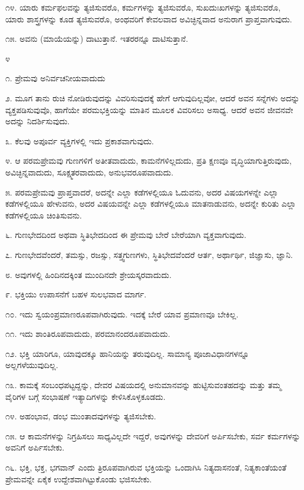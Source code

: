 ೧೪. ಯಾರು ಕರ್ಮಫಲವನ್ನು ತ್ಯಜಿಸುವರೊ, ಕರ್ಮಗಳನ್ನು ತ್ಯಜಿಸುವರೊ, ಸುಖದುಃಖಗಳನ್ನು ತ್ಯಜಿಸುವರೊ, ಯಾರು ಶಾಸ್ತ್ರಗಳನ್ನು ಕೂಡ ತ್ಯಜಿಸುವರೊ, ಅಂಥವರಿಗೆ ಕೇವಲವಾದ ಅವಿಚ್ಛಿನ್ನವಾದ ಅನುರಾಗ ಪ್ರಾಪ್ತವಾಗುವುದು.

೧೫. ಅವನು (ಮಾಯೆಯನ್ನು) ದಾಟುತ್ತಾನೆ. ಇತರರನ್ನೂ ದಾಟಿಸುತ್ತಾನೆ.

\begin{center}
೪
\end{center}

೧. ಪ್ರೇಮವು ಅನಿರ್ವಚನೀಯವಾದುದು

೨. ಮೂಗ ತಾನು ರುಚಿ ನೋಡಿರುವುದನ್ನು ವಿವರಿಸುವುದಕ್ಕೆ ಹೇಗೆ ಆಗುವುದಿಲ್ಲವೋ, ಆದರೆ ಅವನ ಸನ್ನೆಗಳು ಅದನ್ನು ವ್ಯಕ್ತಪಡಿಸುವುವೊ, ಹಾಗೆಯೇ ಪರಮಭಕ್ತಿಯನ್ನು ಮಾತಿನ ಮೂಲಕ ವಿವರಿಸಲು ಅಸಾಧ್ಯ. ಆದರೆ ಅವನ ಜೀವನವೇ ಅದನ್ನು ನಿದರ್ಶಿಸುವುದು.

೩. ಕೆಲವು ಅಪೂರ್ವ ವ್ಯಕ್ತಿಗಳಲ್ಲಿ ಇದು ಪ್ರಕಾಶವಾಗುವುದು.

೪. ಆ ಪರಮಪ್ರೇಮವು ಗುಣಗಳಿಗೆ ಅತೀತವಾದುದು, ಕಾಮನೆಗಳಿಲ್ಲದುದು, ಪ್ರತಿ ಕ್ಷಣವೂ ವೃದ್ಧಿಯಾಗುತ್ತಿರುವುದು, ಅವಿಚ್ಛಿನ್ನವಾದುದು, ಸೂಕ್ಷ್ಮತರವಾದುದು, ಅನುಭವರೂಪವಾದುದು.

೫. ಪರಮಪ್ರೇಮವು ಪ್ರಾಪ್ತವಾದರೆ, ಅದನ್ನೇ ಎಲ್ಲಾ ಕಡೆಗಳಲ್ಲಿಯೂ ಓದುವನು, ಅದರ ವಿಷಯಗಳನ್ನೇ ಎಲ್ಲಾ ಕಡೆಗಳಲ್ಲಿಯೂ ಹೇಳುವನು, ಅದರ ವಿಷಯವನ್ನೇ ಎಲ್ಲಾ ಕಡೆಗಳಲ್ಲಿಯೂ ಮಾತನಾಡುವನು, ಅದನ್ನೇ ಕುರಿತು ಎಲ್ಲಾ ಕಡೆಗಳಲ್ಲಿಯೂ ಚಿಂತಿಸುವನು.

೬. ಗುಣಭೇದದಿಂದ ಅಥವಾ ಸ್ಥಿತಿಭೇದದಿಂದ ಈ ಪ್ರೇಮವು ಬೇರೆ ಬೇರೆಯಾಗಿ ವ್ಯಕ್ತವಾಗುವುದು.

೭. ಗುಣಭೇದವೆಂದರೆ, ತಮಸ್ಸು, ರಜಸ್ಸು, ಸತ್ತ್ವಗುಣಗಳು, ಸ್ಥಿತಿಭೇದವೆಂದರೆ ಆರ್ತ, ಅರ್ಥಾರ್ಥಿ, ಜಿಜ್ಞಾಸು, ಜ್ಞಾನಿ.

೮. ಅವುಗಳಲ್ಲಿ ಹಿಂದಿನದಕ್ಕಿಂತ ಮುಂದಿನದೇ ಶ್ರೇಯಸ್ಕರವಾದುದು.

೯. ಭಕ್ತಿಯು ಉಪಾಸನೆಗೆ ಬಹಳ ಸುಲಭವಾದ ಮಾರ್ಗ.

೧೦. ಇದು ಸ್ವಯಂಪ್ರಮಾಣರೂಪವಾಗಿರುವುದು. ಇದಕ್ಕೆ ಬೇರೆ ಯಾವ ಪ್ರಮಾಣವೂ ಬೇಕಿಲ್ಲ.

೧೧. ಇದು ಶಾಂತಿರೂಪವಾದುದು, ಪರಮಾನಂದರೂಪವಾದುದು.

೧೨. ಭಕ್ತಿ ಯಾರಿಗೂ, ಯಾವುದಕ್ಕೂ ಹಾನಿಯನ್ನು ತರುವುದಿಲ್ಲ. ಸಾಮಾನ್ಯ ಪೂಜಾವಿಧಾನಗಳನ್ನೂ ಅಲ್ಲಗಳೆಯುವುದಿಲ್ಲ.

೧೩. ಕಾಮಕ್ಕೆ ಸಂಬಂಧಪಟ್ಟದ್ದನ್ನು, ದೇವರ ವಿಷಯದಲ್ಲಿ ಅನುಮಾನವನ್ನು ಹುಟ್ಟಿಸುವಂತಹದನ್ನು ಮತ್ತು ತಮ್ಮ ವೈರಿಗಳ ಬಗ್ಗೆ ಸಂಭಾಷಣೆ ಇತ್ಯಾದಿಗಳನ್ನು ಕೇಳಿಸಿಕೊಳ್ಳಕೂಡದು.

೧೪. ಅಹಂಭಾವ, ಡಂಭ ಮುಂತಾದವುಗಳನ್ನು ತ್ಯಜಿಸಬೇಕು.

೧೫. ಆ ಕಾಮನೆಗಳನ್ನು ನಿಗ್ರಹಿಸಲು ಸಾಧ್ಯವಿಲ್ಲದೇ ಇದ್ದರೆ, ಅವುಗಳನ್ನು ದೇವರಿಗೆ ಅರ್ಪಿಸಬೇಕು, ಸರ್ವ ಕರ್ಮಗಳನ್ನು ಅವನಿಗೆ ಅರ್ಪಿಸಬೇಕು.

೧೬. ಭಕ್ತಿ, ಭಕ್ತ, ಭಗವಾನ್​ ಎಂದು ತ್ರಿರೂಪವಾಗಿರುವ ಭಕ್ತಿಯನ್ನು ಒಂದಾಗಿಸಿ ನಿತ್ಯದಾಸನಂತೆ, ನಿತ್ಯಕಾಂತೆಯಂತೆ ಪ್ರೇಮವನ್ನೇ ಏಕೈಕ ಉದ್ದೇಶವಾಗಿಟ್ಟುಕೊಂಡು ಭಜಿಸಬೇಕು.

